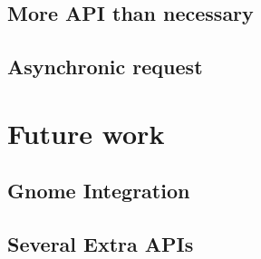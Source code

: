 \documentclass[12pt]{article}
\numberwithin{equation}{section} %
\numberwithin{figure}{section} %
\numberwithin{table}{section} %
\begin{document}
	\subsection{More API than necessary}
	\subsection{Asynchronic request}
\section{Future work}
	\subsection{Gnome Integration}
	\subsection{Several Extra APIs}
\end{document}
